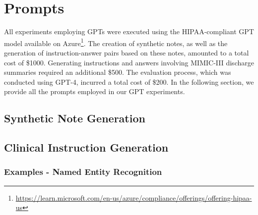 \documentclass[11pt]{article}
\begin{document}







\clearpage
\appendix

\section{Prompts} \label{Appendix A}
All experiments employing GPTs were executed using the HIPAA-compliant GPT model available on Azure\footnote{\url{https://learn.microsoft.com/en-us/azure/compliance/offerings/offering-hipaa-us}}.
The creation of synthetic notes, as well as the generation of instruction-answer pairs based on these notes, amounted to a total cost of \$1000. 
Generating instructions and answers involving MIMIC-III discharge summaries required an additional \$500.
The evaluation process, which was conducted using GPT-4, incurred a total cost of \$200.
In the following section, we provide all the prompts employed in our GPT experiments.

\subsection{Synthetic Note Generation}\label{synthetic note generation}
\begin{tcolorbox}
\small

\end{tcolorbox}

\vfill\eject
\subsection{Clinical Instruction Generation} 
\begin{tcolorbox}
\small

\end{tcolorbox}


\subsubsection{Examples - Named Entity Recognition}
\begin{tcolorbox}
\small

\end{tcolorbox}
\end{document}
